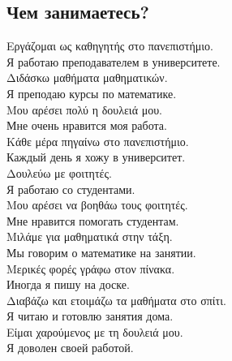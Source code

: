 \documentclass[12pt]{article}
\newcommand{\my}[1]{\textcolor{gray!80!white}{#1}}
\newenvironment{page}{\clearpage\normalsize\null\vfill}{\vfill\null}
\newenvironment{textblock}{\begin{minipage}{\textwidth}}{\end{minipage}\smallskip}
\begin{document}
	\begin{page}
		\subsection{Чем занимаетесь?}
		\begin{textblock}
			Εργάζομαι ως καθηγητής στο πανεπιστήμιο.\\
            \my{Я работаю преподавателем в университете.}\\
			Διδάσκω μαθήματα μαθηματικών.\\
            \my{Я преподаю курсы по математике.}\\
			Μου αρέσει πολύ η δουλειά μου.\\
            \my{Мне очень нравится моя работа.}\\
			Κάθε μέρα πηγαίνω στο πανεπιστήμιο. \\
            \my{Каждый день я хожу в университет.}\\
			Δουλεύω με φοιτητές. \\
            \my{Я работаю со студентами.}\\
			Μου αρέσει να βοηθάω τους φοιτητές.\\
            \my{Мне нравится помогать студентам.}\\
			Μιλάμε για μαθηματικά στην τάξη.\\
            \my{Мы говорим о математике на занятии.}\\
			Μερικές φορές γράφω στον πίνακα.\\
            \my{Иногда я пишу на доске.}\\
			Διαβάζω και ετοιμάζω τα μαθήματα στο σπίτι.\\
            \my{Я читаю и готовлю занятия дома.}\\
			Είμαι χαρούμενος με τη δουλειά μου.\\
            \my{Я доволен своей работой.}\\
		\end{textblock}
	\end{page}
\end{document}
